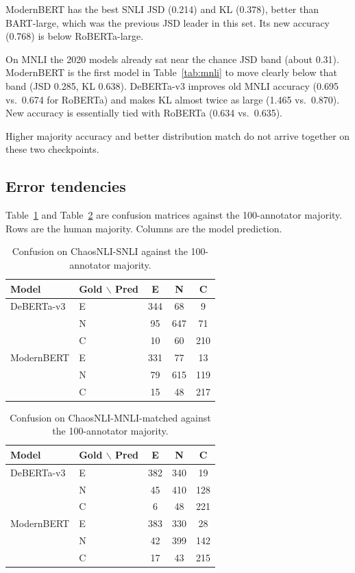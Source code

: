 \documentclass[11pt,a4paper]{article}
\begin{document}
ModernBERT has the best SNLI JSD (0.214) and KL (0.378), better than BART-large, which was the previous JSD leader in this set. Its new accuracy (0.768) is below RoBERTa-large.

On MNLI the 2020 models already sat near the chance JSD band (about 0.31). ModernBERT is the first model in Table~\ref{tab:mnli} to move clearly below that band (JSD 0.285, KL 0.638). DeBERTa-v3 improves old MNLI accuracy (0.695 vs.\ 0.674 for RoBERTa) and makes KL almost twice as large (1.465 vs.\ 0.870). New accuracy is essentially tied with RoBERTa (0.634 vs.\ 0.635).

Higher majority accuracy and better distribution match do not arrive together on these two checkpoints.

\subsection{Error tendencies}
\label{sec:errors}

Table~\ref{tab:conf-snli} and Table~\ref{tab:conf-mnli} are confusion matrices against the 100-annotator majority. Rows are the human majority. Columns are the model prediction.

\begin{table}[H]
\centering
\small
\caption{Confusion on ChaosNLI-SNLI against the 100-annotator majority.}
\label{tab:conf-snli}
\begin{tabular}{llccc}
\toprule
Model & Gold $\backslash$ Pred & E & N & C \\
\midrule
DeBERTa-v3 & E & 344 & 68 & 9 \\
 & N & 95 & 647 & 71 \\
 & C & 10 & 60 & 210 \\
\midrule
ModernBERT & E & 331 & 77 & 13 \\
 & N & 79 & 615 & 119 \\
 & C & 15 & 48 & 217 \\
\bottomrule
\end{tabular}
\end{table}

\begin{table}[H]
\centering
\small
\caption{Confusion on ChaosNLI-MNLI-matched against the 100-annotator majority.}
\label{tab:conf-mnli}
\begin{tabular}{llccc}
\toprule
Model & Gold $\backslash$ Pred & E & N & C \\
\midrule
DeBERTa-v3 & E & 382 & 340 & 19 \\
 & N & 45 & 410 & 128 \\
 & C & 6 & 48 & 221 \\
\midrule
ModernBERT & E & 383 & 330 & 28 \\
 & N & 42 & 399 & 142 \\
 & C & 17 & 43 & 215 \\
\bottomrule
\end{tabular}
\end{table}
\end{document}
